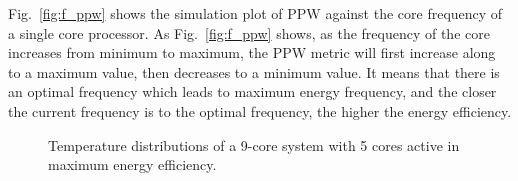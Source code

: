 Fig.~\ref{fig:f_ppw} shows the simulation plot of PPW against the core frequency of a single core processor. As Fig.~\ref{fig:f_ppw} shows, as the frequency of the core increases from minimum to maximum, the PPW metric will first increase along to a maximum value, then decreases to a minimum value. It means that there is an optimal frequency which leads to maximum energy frequency, and the closer the current frequency is to the optimal frequency, the higher the energy efficiency.


\begin{figure}
  \centering
  \caption{Temperature distributions of a 9-core system with 5 cores active in maximum energy efficiency.}
  \label{fig:opt_tem}
\end{figure}




